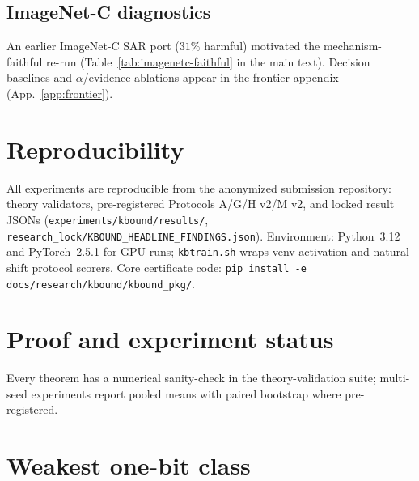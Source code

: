 \subsection{ImageNet-C diagnostics}
An earlier ImageNet-C SAR port ($31\%$ harmful) motivated the mechanism-faithful re-run
(Table~\ref{tab:imagenetc-faithful} in the main text). Decision baselines and $\alpha$/evidence
ablations appear in the frontier appendix (App.~\ref{app:frontier}).

\section{Reproducibility}\label{sec:repro}
All experiments are reproducible from the anonymized submission repository: theory validators,
pre-registered Protocols A/G/H v2/M v2, and locked result JSONs
(\texttt{experiments/kbound/results/}, \texttt{research\_lock/KBOUND\_HEADLINE\_FINDINGS.json}).
Environment: Python~3.12 and PyTorch~2.5.1 for GPU runs; \texttt{kbtrain.sh} wraps venv activation
and natural-shift protocol scorers. Core certificate code:
\texttt{pip install -e docs/research/kbound/kbound\_pkg/}.

\begin{table}[h]\centering\footnotesize
{}
\caption{Reproducibility status for headline tables (June 2026 lock).}
\label{tab:repro-status}
\end{table}

\section{Proof and experiment status}\label{app:status}
Every theorem has a numerical sanity-check in the theory-validation suite; multi-seed
experiments report pooled means with paired bootstrap where pre-registered.



\section{Weakest one-bit class}\label{app:weakest}

